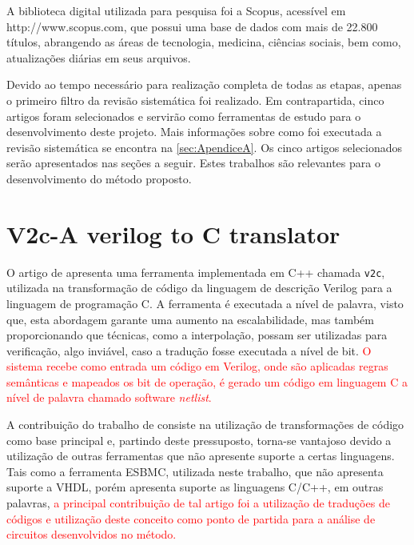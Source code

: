\par
A biblioteca digital utilizada para pesquisa foi a Scopus, acessível em http://www.scopus.com, que possui uma base de dados com mais de 22.800 títulos, abrangendo as áreas de tecnologia, medicina, ciências sociais, bem como, atualizações diárias em seus arquivos.

\par
Devido ao tempo necessário para realização completa de todas as etapas, apenas o primeiro filtro da revisão sistemática foi realizado. Em contrapartida, cinco artigos foram selecionados e servirão como ferramentas de estudo para o desenvolvimento deste projeto. Mais informações sobre como foi executada a revisão sistemática se encontra na \autoref{sec:ApendiceA}. Os cinco artigos selecionados serão apresentados nas seções a seguir. Estes trabalhos são relevantes para o desenvolvimento do método proposto. 

\section{V2c-A verilog to C translator}

O artigo de \citeauthor{mukherjee2016v2c} apresenta uma ferramenta implementada em C++ chamada \texttt{v2c}, utilizada na transformação de código da linguagem de descrição Verilog para a linguagem de programação C. A ferramenta é executada a nível de palavra, visto que, esta abordagem garante uma aumento na escalabilidade, mas também proporcionando que técnicas, como a interpolação\cite{beyer2011cpachecker}, possam ser utilizadas para verificação, algo inviável, caso a tradução fosse executada a nível de bit. \textcolor{red}{O sistema recebe como entrada um código em Verilog, onde são aplicadas regras semânticas e mapeados os bit de operação, é gerado um código em linguagem C a nível de palavra chamado software \textit{netlist}.} 

\par
A contribuição do trabalho de \cite{mukherjee2016v2c} consiste na utilização de transformações de código como base principal e, partindo deste pressuposto, torna-se vantajoso devido a utilização de outras ferramentas que não apresente suporte a certas linguagens. Tais como a ferramenta ESBMC, utilizada neste trabalho, que não apresenta suporte a VHDL, porém apresenta suporte as linguagens C/C++, em outras palavras, \textcolor{red}{a principal contribuição de tal artigo foi a utilização de traduções de códigos e utilização deste conceito como ponto de partida para a análise de circuitos desenvolvidos no método.}

